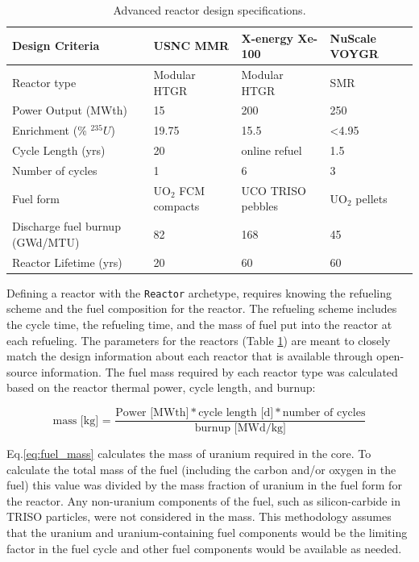 \begin{table}[ht]
    \centering
    \caption{Advanced reactor design specifications.}
    \label{tab:reactor_summary}
    \renewcommand{\arraystretch}{1.5}
    \begin{tabular}{p{3.5cm}p{3cm}p{3cm}p{3cm}}
        \hline
        Design Criteria & \gls{USNC} \gls{MMR} \cite{noauthor_usnc_2021} & 
        X-energy Xe-100 \cite{mulder_overview_2021} & NuScale VOYGR 
        \cite{nuscale_chapter_2020-1,reyes_nuscale_2021,reyes_correction_2022}\\
        \hline
        Reactor type & Modular HTGR & Modular HTGR & SMR\\
        Power Output (MWth) & 15 & 200  & 250 \\
        Enrichment (\% $^{235}U$) & 19.75 & 15.5 & <4.95 \\
        Cycle Length (yrs) & 20 & online refuel & 1.5\\
        Number of cycles & 1 & 6 & 3\\
        Fuel form & UO$_2$ \gls{FCM} compacts & UCO \gls{TRISO} pebbles & UO$_2$ pellets\\
        Discharge fuel burnup (GWd/MTU) & 82 & 168  & 45 \\
        Reactor Lifetime (yrs)& 20 & 60 & 60 \\
        \hline
    \end{tabular}
\end{table}

Defining a reactor with the \Cycamore \texttt{Reactor} archetype, 
requires knowing the refueling scheme and the fuel composition for 
the reactor. The refueling scheme includes 
the cycle time, the refueling time, and the mass of fuel put into the reactor 
at each refueling. The parameters for the reactors (Table \ref{tab:reactor_summary})
are meant to closely match the design information about each reactor that 
is available through open-source information. The fuel mass required by 
each reactor type was calculated based on the reactor thermal power, 
cycle length, and burnup:

\begin{equation}
    \text{mass [kg] = }\frac{\text{Power [MWth]}* \text{cycle 
    length [d]} * \text{number of cycles}}{\text{burnup [MWd/kg]}}
    \label{eq:fuel_mass}
\end{equation}

\noindent Eq.\ref{eq:fuel_mass} calculates the mass of uranium required 
in the core. To calculate the total mass of the fuel (including the carbon 
and/or oxygen in the fuel) this value was divided by the mass fraction of 
uranium in the fuel form for the reactor. Any non-uranium components 
of the fuel, such as silicon-carbide in \gls{TRISO} particles, were 
not considered in the mass. This methodology assumes that the 
uranium and uranium-containing fuel components would be the limiting 
factor in the fuel cycle and other fuel components would be available as 
needed. 


